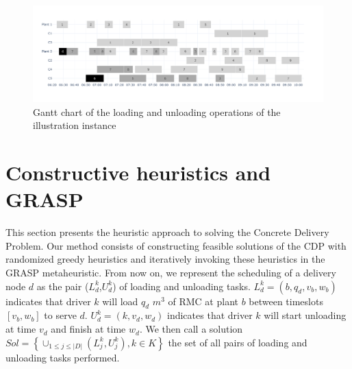 \documentclass[]{article}
\begin{document}
{
\begin{table}[!ht]
    \centering
    \caption{Information of the illustration instance}
    \label{tab:instance_detail}
\end{table}
}
\begin{figure}[htb]
    \centering
    \caption{Gantt chart of the loading and unloading operations of the illustration instance}
    \label{fig:plants_schedules}
        \includegraphics[width=\linewidth]{gantt_example.pdf}
\end{figure}

\section{Constructive heuristics and GRASP}
\label{sec:cdp_grasp_method}

This section presents the heuristic approach to solving the Concrete Delivery Problem. Our method consists of constructing feasible solutions of the CDP with randomized greedy heuristics and iteratively invoking these heuristics in the GRASP metaheuristic. From now on, we represent the scheduling of a delivery node $d$ as the pair ($L^k_{d}$,$U^k_{d}$) of loading and unloading tasks. $L^k_{d} = \left(b,q_d,v_b,w_b\right)$ indicates that driver $k$ will load $q_d$ $m^3$ of RMC at plant $b$ between timeslots $\left[v_b,w_b\right]$ to serve $d$. $U^k_{d} = \left(k,v_d, w_d\right)$ indicates that driver $k$ will start unloading at time $v_d$ and finish at time $w_d$. We then call a solution $Sol =\left\lbrace \cup _{1 \leq j \leq |D|} (L^k_{j}, U^k_{j}), k \in K \right\rbrace$ the set of all pairs of loading and unloading tasks performed.
\end{document}
